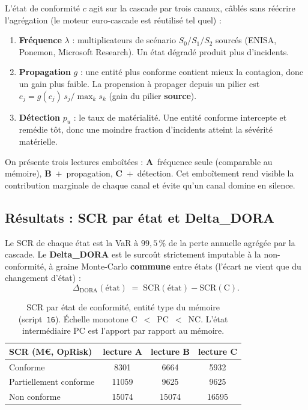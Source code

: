 \documentclass[11pt,a4paper]{article}
\begin{document}
L'état de conformité $c$ agit sur la cascade par trois canaux, câblés sans réécrire
l'agrégation (le moteur euro-cascade est réutilisé tel quel) :
\begin{enumerate}[leftmargin=1.5em,itemsep=1pt,topsep=2pt]
\item \textbf{Fréquence} $\lambda$ : multiplicateurs de scénario $S_0/S_1/S_2$ sourcés
  (ENISA, Ponemon, Microsoft Research). Un état dégradé produit plus d'incidents.
\item \textbf{Propagation} $g$ : une entité plus conforme contient mieux la contagion, donc
  un gain plus faible. La propension à propager depuis un pilier est $e_j=g(c_j)\,s_j/\max_k s_k$
  (gain du pilier \textbf{source}).
\item \textbf{Détection} $p_u$ : le taux de matérialité. Une entité conforme intercepte et
  remédie tôt, donc une moindre fraction d'incidents atteint la sévérité matérielle.
\end{enumerate}
On présente trois lectures emboîtées : \textbf{A}~fréquence seule (comparable au mémoire),
\textbf{B}~$+$~propagation, \textbf{C}~$+$~détection. Cet emboîtement rend visible la
contribution marginale de chaque canal et évite qu'un canal domine en silence.

\subsection{Résultats : SCR par état et Delta\_DORA}

Le SCR de chaque état est la VaR à $99{,}5\,\%$ de la perte annuelle agrégée par la cascade.
Le \textbf{Delta\_DORA} est le surcoût strictement imputable à la non-conformité, à graine
Monte-Carlo \textbf{commune} entre états (l'écart ne vient que du changement d'état) :
\begin{equation}
\Delta_{\text{DORA}}(\text{état}) \;=\; \mathrm{SCR}(\text{état}) - \mathrm{SCR}(\text{C}).
\end{equation}

\begin{table}[h]\centering\small
\renewcommand{\arraystretch}{1.25}
\begin{tabular}{@{}l ccc@{}}
\toprule
SCR (M\euro, OpRisk) & lecture A & lecture B & lecture C \\
\midrule
Conforme               & 8301  & 6664  & 5932 \\
Partiellement conforme & 11059 & 9625  & 9625 \\
Non conforme           & 15074 & 15074 & 16595 \\
\bottomrule
\end{tabular}
\caption{SCR par état de conformité, entité type du mémoire (script~\texttt{16}). Échelle
monotone C~$<$~PC~$<$~NC. L'état intermédiaire PC est l'apport par rapport au mémoire.}
\end{table}
\end{document}
